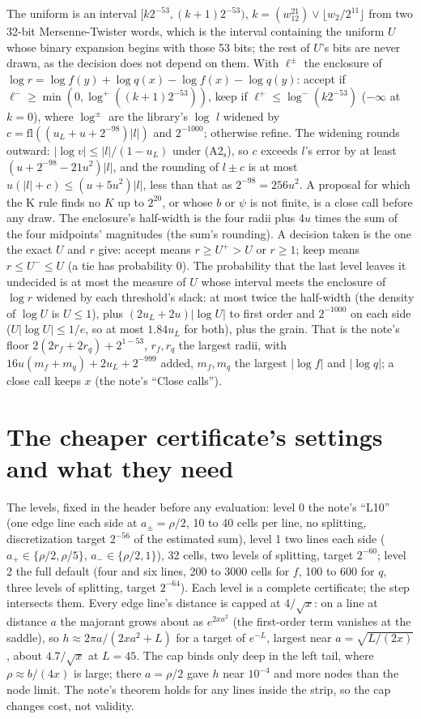 \documentclass[11pt]{article}
\theoremstyle{definition}
\newcommand{\fl}{\mathrm{fl}}
\begin{document}
The uniform is an interval $[k2^{-53},(k+1)2^{-53})$, $k=(w_12^{21})\vee\lfloor w_2/2^{11}\rfloor$ from two 32-bit
Mersenne-Twister words, which is the interval containing the uniform $U$ whose binary expansion begins with those 53
bits; the rest of $U$'s bits are never drawn, as the decision does not depend on them. With $\ell^\pm$ the
enclosure of $\log r=\log f(y)+\log q(x)-\log f(x)-\log q(y)$: accept if $\ell^-\ge\min(0,\log^+((k+1)2^{-53}))$,
keep if $\ell^+\le\log^-(k2^{-53})$ ($-\infty$ at $k=0$), where $\log^\pm$ are the library's $\log$ $l$ widened by
$c=\fl((u_L+u+2^{-98})|l|)$ and $2^{-1000}$; otherwise refine. The widening rounds outward: $|\log v|\le|l|/(1-u_L)$
under (A2$_{\mathrm s}$), so $c$ exceeds $l$'s error by at least $(u+2^{-98}-21u^2)|l|$, and the rounding of
$l\pm c$ is at most $u(|l|+c)\le(u+5u^2)|l|$, less than that as $2^{-98}=256u^2$. A proposal for which the K rule finds no $K$ up to $2^{20}$, or whose $b$ or $\psi$
is not finite, is a close call before any draw. The enclosure's half-width is the four radii plus $4u$ times the sum of
the four midpoints' magnitudes (the sum's rounding). A decision taken is the one the exact $U$ and $r$ give:
accept means
$r\ge U^+>U$ or $r\ge1$; keep means $r\le U^-\le U$ (a tie has probability 0). The probability that the last level
leaves it undecided is at most the measure of $U$ whose interval meets the enclosure of $\log r$ widened by each
threshold's slack: at most twice the half-width (the density of $\log U$ is $U\le1$), plus $(2u_L+2u)|\log U|$ to
first order and $2^{-1000}$ on each side ($U|\log U|\le1/e$, so at most $1.84u_L$ for both), plus the grain. That is the note's floor
$2(2r_f+2r_q)+2^{1-53}$, $r_f,r_q$ the largest radii, with $16u(m_f+m_q)+2u_L+2^{-999}$ added, $m_f,m_q$ the
largest $|\log f|$ and $|\log q|$; a close call keeps $x$ (the note's ``Close calls'').

\section{The cheaper certificate's settings and what they need}\label{sec:cheap}

The levels, fixed in the header before any evaluation: level 0 the note's ``L10'' (one edge line each side at
$a_\pm=\rho/2$, 10 to 40 cells per line, no splitting, discretization target $2^{-56}$ of the estimated sum), level 1
two lines each side ($a_+\in\{\rho/2,\rho/5\}$, $a_-\in\{\rho/2,1\}$), 32 cells, two levels of splitting, target
$2^{-60}$; level 2 the full default (four and six lines, 200 to 3000 cells for $f$, 100 to 600 for $q$, three levels
of splitting, target $2^{-64}$). Each level is a complete certificate; the step intersects them. Every edge
line's distance is capped at $4/\sqrt x$: on a line at distance $a$ the majorant grows about as $e^{2xa^2}$ (the
first-order term vanishes at the saddle), so $h\approx2\pi a/(2xa^2+L)$ for a target of $e^{-L}$, largest near
$a=\sqrt{L/(2x)}$, about $4.7/\sqrt x$ at $L=45$. The cap binds only deep in the left tail, where $\rho\approx
b/(4x)$ is large; there $a=\rho/2$ gave $h$ near $10^{-4}$ and more nodes than the node limit. The note's theorem
holds for any lines inside the strip, so the cap changes cost, not validity.
\end{document}
